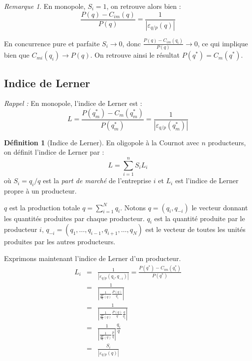 \documentclass[
]{book}
\theoremstyle{definition}
\newtheorem{definition}{Définition}[chapter]
\theoremstyle{definition}
\theoremstyle{definition}
\theoremstyle{definition}
\theoremstyle{remark}
\newtheorem*{remark}{Remarque}
\begin{document}
\begin{remark}
En monopole, \(S_i=1\), on retrouve alors bien :
\[\frac{P(q) -C_{im}(q)}{P(q)}= \frac{1}{\left|\varepsilon_{q/p}(q)\right|}\]

En concurrence pure et parfaite \(S_i\to 0\), donc \(\frac{P(q) -C_{im}(q_i)}{P(q)}\to 0\), ce qui implique bien que \(C_{mi}(q_i)\to P(q)\).
On retrouve ainsi le résultat \(P(q^*)=C_m(q^*)\).
\end{remark}

\hypertarget{indice-de-lerner}{%
\subsection{Indice de Lerner}\label{indice-de-lerner}}

\emph{Rappel :} En monopole, l'indice de Lerner est :
\[L=\frac{P(q_m^*)-C_m(q_m^*)}{P(q_m^*)} = \frac{1}{\left|\varepsilon_{q/p}(q_m^*)\right|}\]

\begin{definition}[Indice de Lerner]
En oligopole à la Cournot avec \(n\) producteurs, on définit l'indice de Lerner par :
\[L = \sum_{i=1}^nS_iL_i\]
où \(S_i=q_i/q\) est la \emph{part de marché} de l'entreprise \(i\) et \(L_i\) est l'indice de Lerner propre à un producteur.
\end{definition}

\(q\) est la production totale \(q=\sum_{i=1}^N q_i\).
Notons \(q=(q_i, q_{-i})\) le vecteur donnant les quantités produites par chaque producteur.
\(q_i\) est la quantité produite par le producteur \(i\), \(q_{-i}=(q_1,\dots,q_{i-1}, q_{i+1}, \dots,q_N)\) est le vecteur de toutes les unités produites par les autres producteurs.

Exprimons maintenant l'indice de Lerner d'un producteur.
\[
\begin{array}{rcl}
L_i &=&\frac{1}{\left|\varepsilon_{q/p}(q_i, q_{-i})\right|}=\frac{P(q^*)-C_{im}(q_i^*)}{P(q^*)}\\
&=&\frac{1}{\left|\frac{1}{\frac{\partial P}{\partial q}(q)}\frac{P(q)}{q_i}\right|}\\
&=&\frac{1}{\left|\frac{1}{\frac{\partial P}{\partial q}(q)}\frac{P(q)}{q}\frac{q}{q_i}\right|}\\
&=&\frac{1}{\left|\frac{1}{\frac{\partial P}{\partial q}(q)}\frac{p}{q}\right|}\frac{q_i}{q}\\
&=&\frac{S_i}{\left|\varepsilon_{q/p}(q)\right|}\\
\end{array}
\]
\end{document}
